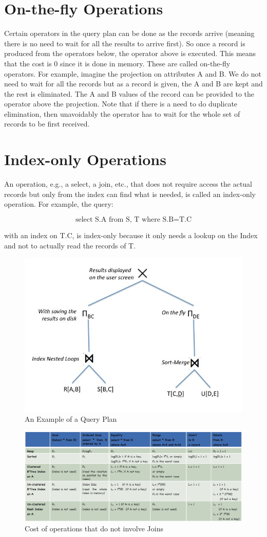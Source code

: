 \documentclass[11pt]{article}
\begin{document}
\section{On-the-fly Operations}

Certain operators in the query plan can be done as the records arrive (meaning there is no need to wait for all the results to arrive first). So once a record is produced from the operators below, the operator above is executed. This means that the cost is 0 since it is done in memory. These are called on-the-fly operators. For example, imagine the projection on attributes A and B. We do not need to wait for all the records but as a record is given, the A and B are kept and the rest is eliminated. The A and B values of the record can be provided to the operator above the projection.
Note that if there is a need to do duplicate elimination, then unavoidably the operator has to wait for the whole set of records to be first received.

\section{Index-only Operations}

An operation, e.g., a select, a join, etc., that does not require access the actual records but only from the index can find what is needed, is called an index-only operation. For example, the query: 

$$\text{select S.A from S, T where S.B=T.C}$$

with an index on T.C, is index-only because it only needs a lookup on the Index and not to actually read the records of T.

\begin{figure}[h]
\includegraphics[scale=0.5]{img1.jpg}
\centering
\caption{An Example of a Query Plan}
\end{figure}

\begin{figure}[h]
\includegraphics[scale=0.47]{img2.jpg}
\centering
\caption{Cost of operations that do not involve Joins}
\end{figure}
\end{document}
